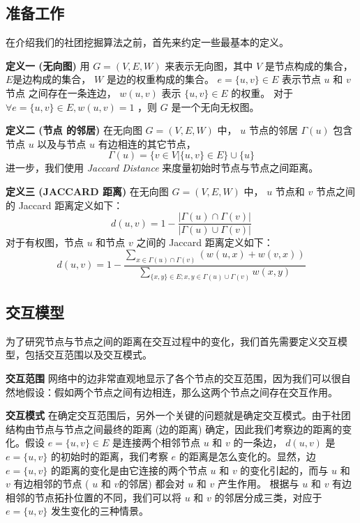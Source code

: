 \subsection{准备工作}
在介绍我们的社团挖掘算法之前，首先来约定一些最基本的定义。 \par
\textbf{定义一 \hspace{1mm} (无向图)} 用 $G=(V,E,W)$ 来表示无向图，其中 $V$ 是节点构成的集合， $E$是边构成的集合， $W$ 是边的权重构成的集合。 $ e = \{u,v\} \in E$ 表示节点 $u$ 和 $v$ 节点 之间存在一条连边， $w(u,v)$ 表示 $ \{u,v\} \in E$ 的权重。 对于 $\forall e = \{u,v\} \in E, w(u,v) = 1$ ，则 $G$ 是一个无向无权图。\par
\vspace{1mm}
\textbf{定义二 \hspace{1mm} (节点 的邻居)} 在无向图 $G=(V,E,W)$ 中， $u$ 节点的邻居 $\Gamma(u)$ 包含节点 $u$ 以及与节点 $u$ 有边相连的其它节点，
\begin{equation*}
\label{nb}
\Gamma(u) =\{v \in V | \{u,v\} \in E\} \cup \{u\}
\end{equation*}
进一步，我们使用 \emph{Jaccard Distance} 来度量初始时节点与节点之间距离。\par
\textbf{定义三 \hspace{1mm} (\textsc{JACCARD 距离})} 在无向图 $G=(V,E,W)$ 中， $u$ 节点和 $v$ 节点之间的 Jaccard 距离定义如下：
\begin{equation*}
\label{eq:jaccard}
d(u,v) = 1- \frac{|\Gamma(u) \cap \Gamma(v) |}{|\Gamma(u) \cup \Gamma(v) |}
\end{equation*}
对于有权图，节点 $u$ 和节点 $v$ 之间的 Jaccard 距离定义如下：
\begin{equation*}
\label{eq:wjaccard}
d(u,v) = 1- \frac{\sum_{x\in \Gamma(u) \cap \Gamma(v)}(w(u,x) +w(v,x))}{\sum_{\{x,y\}\in E; x,y \in \Gamma(u) \cup \Gamma(v)}  w(x,y)}
\end{equation*}

\subsection{交互模型}
为了研究节点与节点之间的距离在交互过程中的变化，我们首先需要定义交互模型，包括交互范围以及交互模式。\par
\vspace{1mm}
\textbf{交互范围} 网络中的边非常直观地显示了各个节点的交互范围，因为我们可以很自然地假设：假如两个节点之间有边相连，那么这两个节点之间存在交互作用。\par
\textbf{交互模式} 在确定交互范围后，另外一个关键的问题就是确定交互模式。由于社团结构由节点与节点之间最终的距离 (边的距离) 确定，因此我们考察边的距离的变化。假设 $ e = \{u,v\} \in E$ 是连接两个相邻节点 $u$ 和 $v$ 的一条边， $d(u,v)$ 是 $e = \{u,v\}$ 的初始时的距离，我们考察 $e$ 的距离是怎么变化的。显然，边 $e = \{u,v\}$ 的距离的变化是由它连接的两个节点 $u$ 和 $v$ 的变化引起的，而与 $u$ 和 $v$ 有边相邻的节点 ( $u$ 和 $v$的邻居) 都会对 $u$ 和 $v$ 产生作用。 根据与 $u$ 和 $v$ 有边相邻的节点拓扑位置的不同，我们可以将 $u$ 和 $v$ 的邻居分成三类，对应于 $e = \{u,v\}$ 发生变化的三种情景。\par
{}

